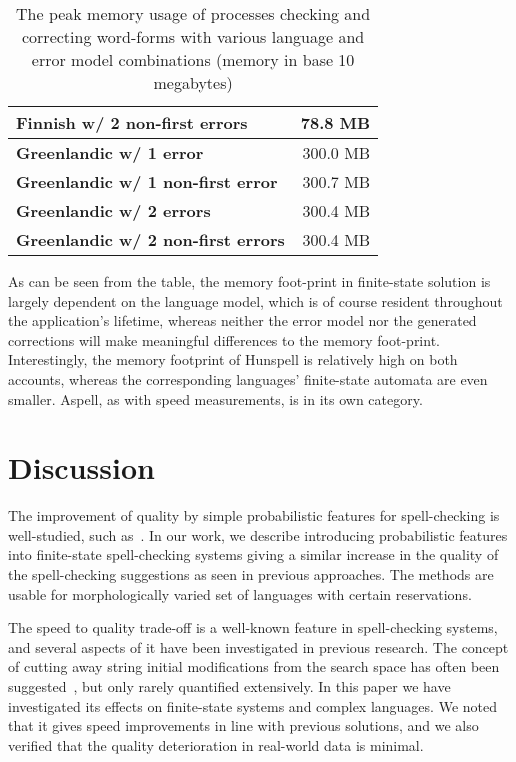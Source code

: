 \documentclass[a4paper,12pt]{article}
\begin{document}
\begin{table}
\begin{tabular}{|l|r|}
\bf Finnish w/ 2 non-first errors & 78.8 MB \\
        \hline
        \bf Greenlandic w/ 1 error & 300.0 MB \\
\bf Greenlandic w/ 1 non-first error & 300.7 MB \\
       \bf Greenlandic w/ 2 errors & 300.4 MB \\
\bf Greenlandic w/ 2 non-first errors & 300.4 MB \\
        \hline
    \end{tabular}
    \caption{The peak memory usage of processes checking and correcting
        word-forms with various language and error model combinations
        (memory in base 10 megabytes) \label{table:memory}}
\end{table}

As can be seen from the table, the memory foot-print in finite-state
solution is largely dependent on the language model, which is of course
resident throughout the application's lifetime, whereas neither the error model
nor the generated corrections will make meaningful differences to the memory
foot-print. Interestingly, the memory footprint of Hunspell is relatively
high on both accounts, whereas the corresponding languages' finite-state
automata are even smaller. Aspell, as with speed measurements, is in its own
category.

\section{Discussion}
\label{sec:discussion}

The improvement of quality by simple probabilistic features for spell-checking
is well-studied, such as~\cite{church1991probability}. In our work, we
describe introducing probabilistic features into finite-state spell-checking
systems giving a similar increase in the quality of the spell-checking
suggestions as seen in previous approaches. The methods are usable for
morphologically varied set of languages with certain reservations.

The speed to quality trade-off is a well-known feature in spell-checking
systems, and several aspects of it have been investigated in previous research.
The concept of cutting away string initial modifications from the search space
has often been suggested~\cite[]{kukich1992techniques,bhagat2007spelling}, but
only rarely quantified extensively. In this paper we have investigated its
effects on finite-state systems and complex languages. We noted that it gives
speed improvements in line with previous solutions, and we
also verified that the quality deterioration in real-world data is minimal.
\end{document}
